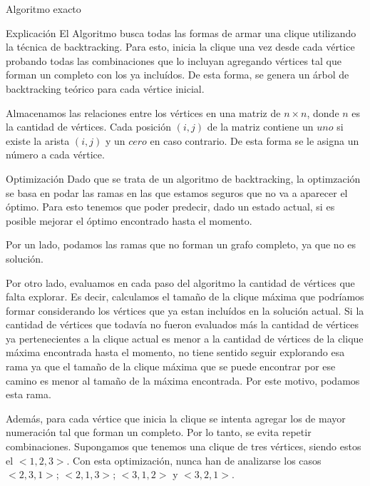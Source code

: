 \begin{section}{Algoritmo exacto}
		\begin{subsection}{Explicación}
			El Algoritmo busca todas las formas de armar una clique utilizando la técnica de backtracking. Para esto, inicia la clique una vez desde cada vértice probando todas las combinaciones que lo incluyan agregando vértices tal que forman un completo con los ya incluídos. De esta forma, se genera un árbol de backtracking teórico para cada vértice inicial.

			Almacenamos las relaciones entre los vértices en una matriz de $n \times n$, donde $n$ es la cantidad de vértices. Cada posición $(i,j)$ de la matriz contiene un $uno$ si existe la arista $(i,j)$ y un $cero$ en caso contrario. De esta forma se le asigna un número a cada vértice.\VSP
		\end{subsection}
		\begin{subsection}{Optimización}
			Dado que se trata de un algoritmo de backtracking, la optimzación se basa en podar las ramas en las que estamos seguros que no va a aparecer el óptimo. Para esto tenemos que poder predecir, dado un estado actual, si es posible mejorar el óptimo encontrado hasta el momento.
			
			Por un lado, podamos las ramas que no forman un grafo completo, ya que no es solución.
			
			Por otro lado, evaluamos en cada paso del algoritmo la cantidad de vértices que falta explorar. Es decir, calculamos el tamaño de la clique máxima que podríamos formar considerando los vértices que ya estan incluídos en la solución actual. Si la cantidad de vértices que todavía no fueron evaluados más la cantidad de vértices ya pertenecientes a la clique actual es menor a la cantidad de vértices de la clique máxima encontrada hasta el momento, no tiene sentido seguir explorando esa rama ya que el tamaño de la clique máxima que se puede encontrar por ese camino es menor al tamaño de la máxima encontrada. Por este motivo, podamos esta rama.

			Además, para cada vértice que inicia la clique se intenta agregar los de mayor numeración tal que forman un completo. Por lo tanto, se evita repetir combinaciones. Supongamos que tenemos una clique de tres vértices, siendo estos el $<1,2,3>$. Con esta optimización, nunca han de analizarse los casos $<2,3,1>$; $<2,1,3>$; $<3,1,2>$ y $<3,2,1>$.
		\end{subsection}

		\newpage
		

\end{section}
